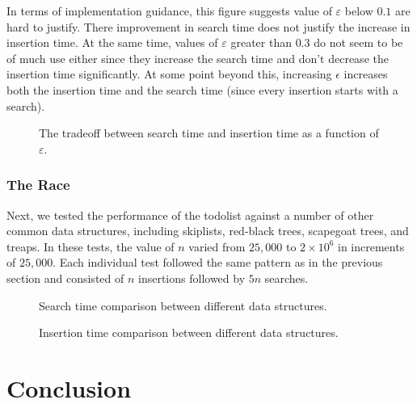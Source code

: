 \documentclass[lotsofwhite]{patmorin}
\newcommand{\eps}{\varepsilon}
\begin{document}
In terms of implementation guidance, this figure suggests value of
$\eps$ below $0.1$ are hard to justify.  There improvement in search
time does not justify the increase in insertion time.  At the same time,
values of $\eps$ greater than $0.3$ do not seem to be of much use either
since they increase the search time and don't decrease the insertion
time significantly. At some point beyond this, increasing $\epsilon$
increases both the insertion time and the search time (since every
insertion starts with a search).

\begin{figure}
  \centering{}
  \caption{The tradeoff between search time and insertion time as a function of $\eps$.}
\end{figure}

\subsubsection{The Race}

Next, we tested the performance of the todolist against a number of
other common data structures, including skiplists, red-black trees,
scapegoat trees, and treaps. In these tests, the value of $n$ varied from $25,000$ to $2\times 10^6$ in increments of $25,000$.   Each individual test followed the same pattern as in the previous section and consisted of $n$ insertions followed by $5n$ searches.

\begin{figure}
  \centering{}
  \caption{Search time comparison between different data structures.}
\end{figure}

\begin{figure}
  \centering{}
  \caption{Insertion time comparison between different data structures.}
\end{figure}



\section{Conclusion}
\end{document}
